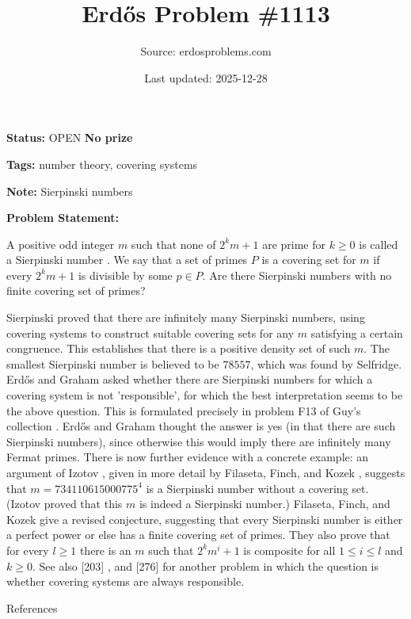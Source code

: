 \documentclass{article}
\title{Erd\H{o}s Problem \#1113}
\date{Last updated: 2025-12-28}
\author{Source: erdosproblems.com}
\begin{document}
\maketitle

\noindent\textbf{Status:} OPEN \quad \textbf{No prize}

\noindent\textbf{Tags:} number theory, covering systems

\medskip
\noindent\textbf{Note:} Sierpinski numbers

\medskip

\noindent\textbf{Problem Statement:}

A positive odd integer $m$ such that none of $2^km+1$ are prime for $k\geq 0$ is called a Sierpinski number . We say that a set of primes $P$ is a covering set for $m$ if every $2^km+1$ is divisible by some $p\in P$. Are there Sierpinski numbers with no finite covering set of primes?




Sierpinski \cite{Si60} proved that there are infinitely many Sierpinski numbers, using covering systems to construct suitable covering sets for any $m$ satisfying a certain congruence. This establishes that there is a positive density set of such $m$. The smallest Sierpinski number is believed to be $78557$, which was found by Selfridge. Erd\H{o}s and Graham \cite{ErGr80} asked whether there are Sierpinski numbers for which a covering system is not 'responsible', for which the best interpretation seems to be the above question. This is formulated precisely in problem F13 of Guy's collection \cite{Gu04}. Erd\H{o}s and Graham thought the answer is yes (in that there are such Sierpinski numbers), since otherwise this would imply there are infinitely many Fermat primes. There is now further evidence with a concrete example: an argument of Izotov \cite{Iz95}, given in more detail by Filaseta, Finch, and Kozek \cite{FFK08}, suggests that $m=734110615000775^4$ is a Sierpinski number without a covering set. (Izotov proved that this $m$ is indeed a Sierpinski number.) Filaseta, Finch, and Kozek \cite{FFK08} give a revised conjecture, suggesting that every Sierpinski number is either a perfect power or else has a finite covering set of primes. They also prove that for every $l\geq 1$ there is an $m$ such that $2^km^i+1$ is composite for all $1\leq i\leq l$ and $k\geq 0$. See also [203] , and [276] for another problem in which the question is whether covering systems are always responsible.




References
\end{document}
